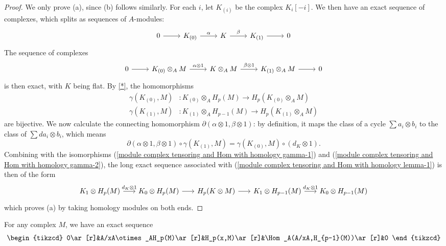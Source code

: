 \begin{proof}
We only prove (a), since (b) follows similarly. For each $i$, let $K_{(i)}$ be the complex $K_i[-i]$. We then have an exact sequence of complexes, which splits as sequences of $A$-modules:
\[\begin{tikzcd}
0\ar[r]&K_{(0)}\ar[r,"\alpha"]&K\ar[r,"\beta"]&K_{(1)}\ar[r]&0
\end{tikzcd}\]
The sequence of complexes
\begin{equation}\label{module complex tensoring and Hom with homology lemma-1}
\begin{tikzcd}
0\ar[r]&K_{(0)}\otimes_AM\ar[r,"\alpha\otimes 1"]&K\otimes_AM\ar[r,"\beta\otimes 1"]&K_{(1)}\otimes_AM\ar[r]&0
\end{tikzcd}
\end{equation}
is then exact, with $K$ being flat. By \cref{*}, the homomorphisms
\begin{align}
\gamma(K_{(0)},M)&:K_{(0)}\otimes_AH_p(M)\to H_p(K_{(0)}\otimes_AM)\label{module complex tensoring and Hom with homology gamma-1}\\
\gamma(K_{(1)},M)&:K_{(1)}\otimes_AH_{p-1}(M)\to H_p(K_{(1)}\otimes_AM)\label{module complex tensoring and Hom with homology gamma-2}
\end{align}
are bijective. We now calculate the connecting homomorphism $\partial(\alpha\otimes 1,\beta\otimes 1)$: by definition, it maps the class of a cycle $\sum a_i\otimes b_i$ to the class of $\sum da_i\otimes b_i$, which means
\[\partial(\alpha\otimes 1,\beta\otimes 1)\circ\gamma(K_{(1)},M)=\gamma(K_{(0)},M)\circ(d_K\otimes 1).\]
Combining with the isomorphisms (\ref{module complex tensoring and Hom with homology gamma-1}) and (\ref{module complex tensoring and Hom with homology gamma-2}), the long exact sequence associated with (\ref{module complex tensoring and Hom with homology lemma-1}) is then of the form
\[\begin{tikzcd}[column sep=6mm]
K_1\otimes H_p(M)\ar[r,"d_K\otimes 1"]&K_0\otimes H_p(M)\ar[r]&H_p(K\otimes M)\ar[r]&K_1\otimes H_{p-1}(M)\ar[r,"d_K\otimes 1"]&K_0\otimes H_{p-1}(M)
\end{tikzcd}\]
which proves (a) by taking homology modules on both ends.
\end{proof}
\begin{proposition}\label{Koszul complex iterated homology prop}
For any complex $M$, we have an exact sequence
\[\begin{tikzcd}
0\ar[r]&A/xA\otimes_AH_p(M)\ar[r]&H_p(x,M)\ar[r]&\Hom_A(A/xA,H_{p-1}(M))\ar[r]&0
\end{tikzcd}\]
\end{proposition}
